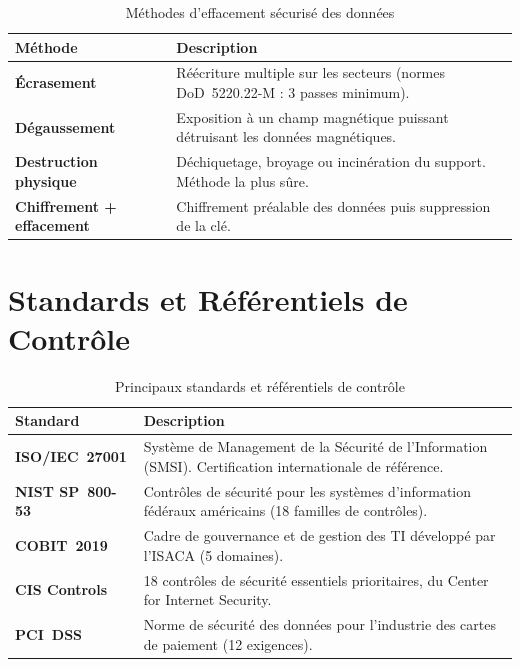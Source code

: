 \begin{table}[H]
\centering
\begin{tabular}{p{3cm}p{9cm}}
    \toprule
    \textbf{Méthode} & \textbf{Description} \\
    \midrule
    \textbf{Écrasement}   & Réécriture multiple sur les secteurs (normes DoD~5220.22-M : 3 passes minimum). \\
    \textbf{Dégaussement} & Exposition à un champ magnétique puissant détruisant les données magnétiques. \\
    \textbf{Destruction physique} & Déchiquetage, broyage ou incinération du support. Méthode la plus sûre. \\
    \textbf{Chiffrement + effacement} & Chiffrement préalable des données puis suppression de la clé. \\
    \bottomrule
\end{tabular}
\caption{Méthodes d'effacement sécurisé des données}
\end{table}

\section{Standards et Référentiels de Contrôle}

\begin{table}[H]
\centering
\small
\begin{tabular}{p{3.5cm}p{8.5cm}}
    \toprule
    \textbf{Standard} & \textbf{Description} \\
    \midrule
    \textbf{ISO/IEC~27001} & Système de Management de la Sécurité de l'Information (SMSI). Certification internationale de référence. \\
    \textbf{NIST SP~800-53} & Contrôles de sécurité pour les systèmes d'information fédéraux américains (18 familles de contrôles). \\
    \textbf{COBIT~2019}     & Cadre de gouvernance et de gestion des TI développé par l'ISACA (5 domaines). \\
    \textbf{CIS Controls}   & 18 contrôles de sécurité essentiels prioritaires, du Center for Internet Security. \\
    \textbf{PCI~DSS}        & Norme de sécurité des données pour l'industrie des cartes de paiement (12 exigences). \\
    \bottomrule
\end{tabular}
\caption{Principaux standards et référentiels de contrôle}
\end{table}

